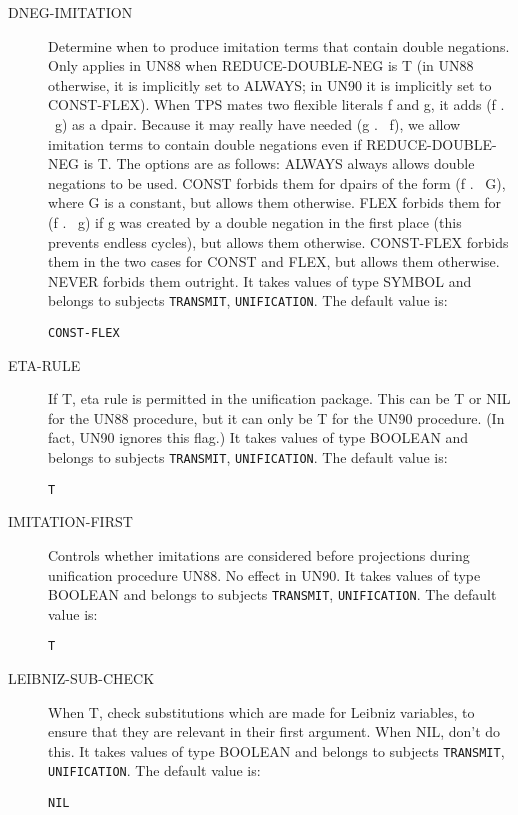 \begin{description}
\item[DNEG-IMITATION]  
Determine when to produce imitation terms that contain
double negations. Only applies in UN88 when REDUCE-DOUBLE-NEG is T
(in UN88 otherwise, it is implicitly set to ALWAYS; in UN90 it is
implicitly set to CONST-FLEX).
When TPS mates two flexible literals f and g, it adds (f . ~g) as
a dpair. Because it may really have needed (g . ~f), we allow 
imitation terms to contain double negations even if REDUCE-DOUBLE-NEG
is T. The options are as follows:
ALWAYS always allows double negations to be used.
CONST forbids them for dpairs of the form (f . ~G), where G is a
  constant, but allows them otherwise.
FLEX forbids them for (f . ~g) if g was created by a double negation
  in the first place (this prevents endless cycles), but allows them
  otherwise.
CONST-FLEX forbids them in the two cases for CONST and FLEX, but allows
  them otherwise.
NEVER forbids them outright.
It takes values of type SYMBOL and belongs to subjects \texttt{TRANSMIT}, \texttt{UNIFICATION}.  The default value is: \begin{lstlisting}
CONST-FLEX
\end{lstlisting}

\item[ETA-RULE]  
If T, eta rule is permitted in the unification package.
This can be T or NIL for the UN88 procedure, but it can only be
T for the UN90 procedure. (In fact, UN90 ignores this flag.)
It takes values of type BOOLEAN and belongs to subjects \texttt{TRANSMIT}, \texttt{UNIFICATION}.  The default value is: \begin{lstlisting}
T
\end{lstlisting}

\item[IMITATION-FIRST]  
Controls whether imitations are considered before projections during
unification procedure UN88. No effect in UN90.
It takes values of type BOOLEAN and belongs to subjects \texttt{TRANSMIT}, \texttt{UNIFICATION}.  The default value is: \begin{lstlisting}
T
\end{lstlisting}

\item[LEIBNIZ-SUB-CHECK]  
When T, check substitutions which are made for Leibniz
variables, to ensure that they are relevant in their first argument.
When NIL, don't do this.
It takes values of type BOOLEAN and belongs to subjects \texttt{TRANSMIT}, \texttt{UNIFICATION}.  The default value is: \begin{lstlisting}
NIL
\end{lstlisting}


\end{description}
